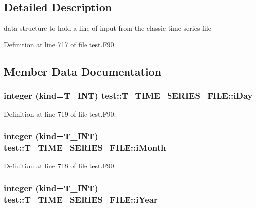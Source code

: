 \subsection{Detailed Description}
data structure to hold a line of input from the classic time-\/series file 

Definition at line 717 of file test.F90.



\subsection{Member Data Documentation}
\hypertarget{typetest_1_1_t___t_i_m_e___s_e_r_i_e_s___f_i_l_e_a58e043b9d803e42f5b5a7af45595cd03}{
\subsubsection[{iDay}]{\setlength{\rightskip}{0pt plus 5cm}integer (kind={\bf T\_\-INT}) {\bf test::T\_\-TIME\_\-SERIES\_\-FILE::iDay}}}
\label{typetest_1_1_t___t_i_m_e___s_e_r_i_e_s___f_i_l_e_a58e043b9d803e42f5b5a7af45595cd03}


Definition at line 719 of file test.F90.

\hypertarget{typetest_1_1_t___t_i_m_e___s_e_r_i_e_s___f_i_l_e_af3bb4f43dc9820f71e9d2c444d096238}{
\subsubsection[{iMonth}]{\setlength{\rightskip}{0pt plus 5cm}integer (kind={\bf T\_\-INT}) {\bf test::T\_\-TIME\_\-SERIES\_\-FILE::iMonth}}}
\label{typetest_1_1_t___t_i_m_e___s_e_r_i_e_s___f_i_l_e_af3bb4f43dc9820f71e9d2c444d096238}


Definition at line 718 of file test.F90.

\hypertarget{typetest_1_1_t___t_i_m_e___s_e_r_i_e_s___f_i_l_e_ad6e179a39ffec0e57a9afcc9af05c9c9}{
\subsubsection[{iYear}]{\setlength{\rightskip}{0pt plus 5cm}integer (kind={\bf T\_\-INT}) {\bf test::T\_\-TIME\_\-SERIES\_\-FILE::iYear}}}
\label{typetest_1_1_t___t_i_m_e___s_e_r_i_e_s___f_i_l_e_ad6e179a39ffec0e57a9afcc9af05c9c9}


